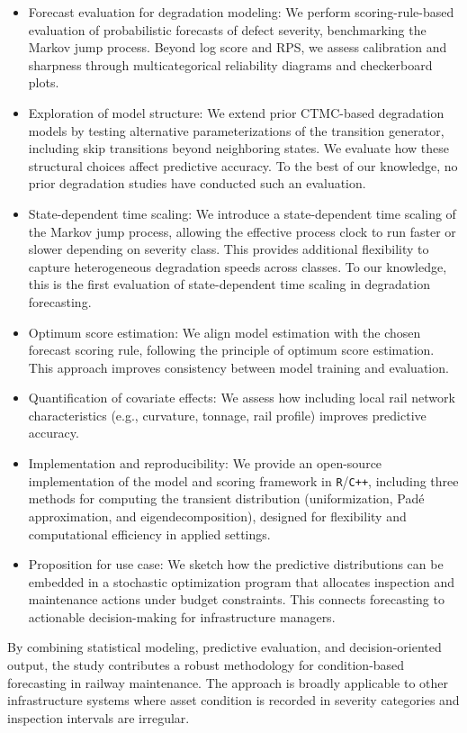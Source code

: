\begin{itemize}
    \item Forecast evaluation for degradation modeling: We perform scoring-rule-based evaluation of probabilistic forecasts of defect severity, benchmarking the Markov jump process. Beyond log score and RPS, we assess calibration and sharpness through multicategorical reliability diagrams and checkerboard plots.
    \item Exploration of model structure: We extend prior CTMC-based degradation models by testing alternative parameterizations of the transition generator, including skip transitions beyond neighboring states. We evaluate how these structural choices affect predictive accuracy. To the best of our knowledge, no prior degradation studies have conducted such an evaluation.
    \item State-dependent time scaling: We introduce a state-dependent time scaling of the Markov jump process, allowing the effective process clock to run faster or slower depending on severity class. This provides additional flexibility to capture heterogeneous degradation speeds across classes. To our knowledge, this is the first evaluation of state-dependent time scaling in degradation forecasting.
    \item Optimum score estimation: We align model estimation with the chosen forecast scoring rule, following the principle of optimum score estimation. This approach improves consistency between model training and evaluation.
    \item Quantification of covariate effects: We assess how including local rail network characteristics (e.g., curvature, tonnage, rail profile) improves predictive accuracy.
    \item Implementation and reproducibility: We provide an open-source implementation of the model and scoring framework in \texttt{R}/\texttt{C++}, including three methods for computing the transient distribution (uniformization, Padé approximation, and eigendecomposition), designed for flexibility and computational efficiency in applied settings.
    \item Proposition for use case: We sketch how the predictive distributions can be embedded in a stochastic optimization program that allocates inspection and maintenance actions under budget constraints. This connects forecasting to actionable decision-making for infrastructure managers.
\end{itemize}

By combining statistical modeling, predictive evaluation, and decision-oriented output, the study contributes a robust methodology for condition-based forecasting in railway maintenance. The approach is broadly applicable to other infrastructure systems where asset condition is recorded in severity categories and inspection intervals are irregular.



